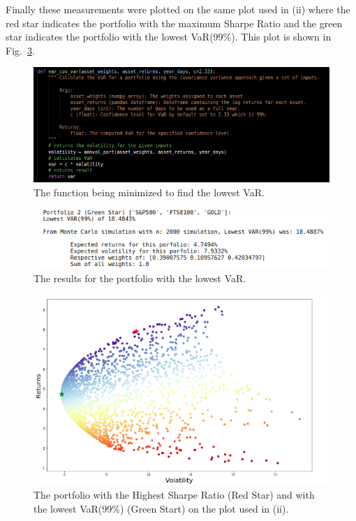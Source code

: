 \noindent 
Finally these measurements were plotted on the same plot used in (ii) where the red star indicates the portfolio with the maximum Sharpe Ratio and the green star indicates the portfolio with the lowest VaR(99\%). This plot is shown in Fig.~\ref{fig:portsimbest}.

\begin{figure}[H]
\centering
  \includegraphics[scale = .75]{imgs/varminimize.png}
  \caption{The function being minimized to find the lowest VaR.}
  \label{fig:minimizeminvarport}
\end{figure}

\begin{figure}[H]
\centering
  \includegraphics[scale = .75]{imgs/minvarresults.png}
  \caption{The results for the portfolio with the lowest VaR.}
  \label{fig:minvarresults}
\end{figure}

\begin{figure}[H]
\centering
  \includegraphics[scale = .65]{imgs/port_simulation_best.png}
  \caption{The portfolio with the Highest Sharpe Ratio (Red Star) and with the lowest VaR(99\%) (Green Start) on the plot used in (ii).}
  \label{fig:portsimbest}
\end{figure}

